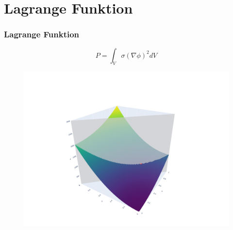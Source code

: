 \documentclass[xcolor=dvipsnames,envcountsect]{beamer}
\begin{document}
\section{Lagrange Funktion}
\begin{frame}
	\frametitle{Lagrange Funktion}

	\begin{equation}
		P=\int_V \sigma(\nabla \phi)^2 d V
		\label{circuit:current_density_7}
	\end{equation}
	\begin{figure}
		\includegraphics[width= 0.8\linewidth]{01_Pictures/newplot.png}
	\end{figure}

\end{frame}
\end{document}
